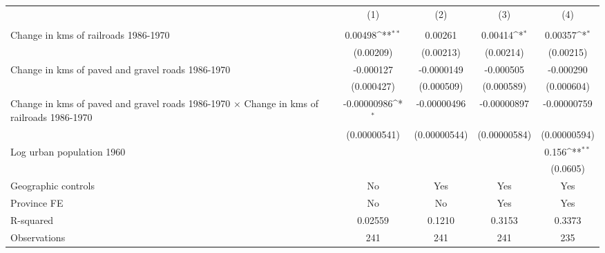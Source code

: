 {
\def\sym#1{\ifmmode^{#1}\else\(^{#1}\)\fi}
\begin{tabular}{l*{4}{c}}
\hline\hline
                &\multicolumn{1}{c}{(1)}&\multicolumn{1}{c}{(2)}&\multicolumn{1}{c}{(3)}&\multicolumn{1}{c}{(4)}\\
                &\multicolumn{1}{c}{}&\multicolumn{1}{c}{}&\multicolumn{1}{c}{}&\multicolumn{1}{c}{}\\
\hline
Change in kms of railroads 1986-1970&  0.00498\sym{**} &  0.00261         &  0.00414\sym{*}  &  0.00357\sym{*}  \\
                &(0.00209)         &(0.00213)         &(0.00214)         &(0.00215)         \\
[1em]
Change in kms of paved and gravel roads 1986-1970&-0.000127         &-0.0000149         &-0.000505         &-0.000290         \\
                &(0.000427)         &(0.000509)         &(0.000589)         &(0.000604)         \\
[1em]
Change in kms of paved and gravel roads 1986-1970 $\times$ Change in kms of railroads 1986-1970&-0.00000986\sym{*}  &-0.00000496         &-0.00000897         &-0.00000759         \\
                &(0.00000541)         &(0.00000544)         &(0.00000584)         &(0.00000594)         \\
[1em]
Log urban population 1960&                  &                  &                  &    0.156\sym{**} \\
                &                  &                  &                  & (0.0605)         \\
\hline
Geographic controls&       No         &      Yes         &      Yes         &      Yes         \\
Province FE     &       No         &       No         &      Yes         &      Yes         \\
R-squared       &  0.02559         &   0.1210         &   0.3153         &   0.3373         \\
Observations    &      241         &      241         &      241         &      235         \\
\hline\hline
\end{tabular}
}
